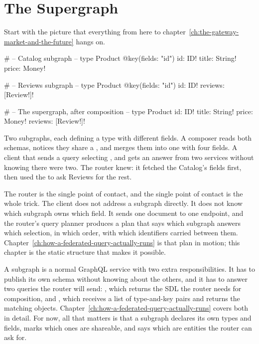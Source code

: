 \section{The Supergraph}
\label{sec:ch06-the-supergraph}
%

Start with the picture that everything from here to
chapter~\ref{ch:the-gateway-market-and-the-future} hangs on.

\begin{graphqlsdl}
# -- Catalog subgraph --
type Product @key(fields: "id") {
  id: ID!
  title: String!
  price: Money!
}

# -- Reviews subgraph --
type Product @key(fields: "id") {
  id: ID!
  reviews: [Review!]!
}

# -- The supergraph, after composition --
type Product {
  id: ID!
  title: String!
  price: Money!
  reviews: [Review!]!
}
\end{graphqlsdl}

Two subgraphs, each defining a  type with different fields. A
composer reads both schemas, notices they share a , and merges them
into one  with four fields. A client that sends a query selecting
,  and  gets an answer from two services
without knowing there were two. The router knew: it fetched the Catalog's fields
first, then used the  to ask Reviews for the rest.

%
The router is the single point of contact, and the single point of contact is
the whole trick. The client does not address a subgraph directly. It does not
know which subgraph owns which field. It sends one document to one endpoint, and
the router's query planner produces a plan that says which subgraph answers
which selection, in which order, with which identifiers carried between them.
Chapter~\ref{ch:how-a-federated-query-actually-runs} is that plan in motion;
this chapter is the static structure that makes it possible.

%
A subgraph is a normal GraphQL service with two extra responsibilities. It has
to publish its own schema without knowing about the others, and it has to answer
two queries the router will send: , which returns the SDL the
router needs for composition, and , which receives a list of
type-and-key pairs and returns the matching objects. Chapter~\ref{ch:how-a-federated-query-actually-runs}
covers both in detail. For now, all that matters is that a subgraph declares its
own types and fields, marks which ones are shareable, and says which are
entities the router can ask for.

